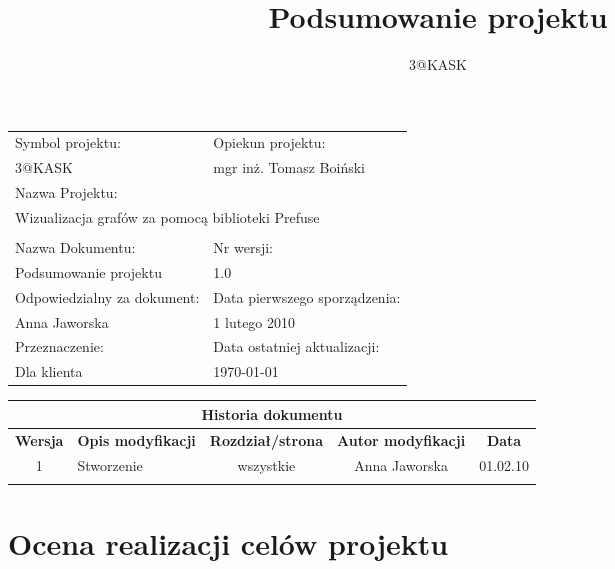 \documentclass[a4paper,10pt]{article}
\title{Podsumowanie projektu}
\author{3@KASK}
\begin{document}



\maketitle


\begin{center}
\begin{tabular}{|p{7cm}|p{7cm}|}
\hline
Symbol projektu: & Opiekun projektu:   \tabularnewline 
3@KASK & mgr inż. Tomasz Boiński    \tabularnewline \hline
\multicolumn{2}{|l|}{Nazwa Projektu: } \tabularnewline
\multicolumn{2}{|l|}{Wizualizacja grafów za pomocą biblioteki Prefuse } \tabularnewline 
\hline
\multicolumn{2}{l}{ } \tabularnewline %
\hline 
Nazwa Dokumentu: & Nr wersji:   \tabularnewline 
Podsumowanie projektu & 1.0 \tabularnewline \hline
Odpowiedzialny za dokument: & Data pierwszego sporządzenia:   \tabularnewline 
Anna Jaworska & 1 lutego 2010 \tabularnewline \hline
Przeznaczenie: & Data ostatniej aktualizacji:   \tabularnewline 
Dla klienta & \today \tabularnewline \hline
\end{tabular}
\end{center}

\begin{center}
\begin{tabular}{|c|p{4cm}|c|c|c|}
\multicolumn{5}{c}{\textbf{Historia dokumentu}} \tabularnewline \hline
\textbf{Wersja} & \textbf{Opis modyfikacji} & \textbf{Rozdział/strona} & \textbf{Autor modyfikacji} & \textbf{Data} \tabularnewline \hline 
1 & Stworzenie & wszystkie & Anna Jaworska & 01.02.10 \tabularnewline \hline
& & & &\tabularnewline \hline
\end{tabular}
 

\end{center}


\newpage
\tableofcontents
\newpage




\section{Ocena realizacji celów projektu}
\end{document}

